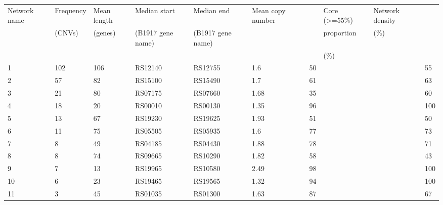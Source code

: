 


\begin{table}[]
\begin{tabular}{llllllllll}
Network name & Frequency & Mean length & Median start      & Median end        & Mean copy number &    & Core (\textgreater{}=55\%) & Network density &     \\
             & (CNVs)    & (genes)     & (B1917 gene name) & (B1917 gene name) &                  &    & proportion                 & (\%)            &     \\
             &           &             &                   &                   &                  &    & (\%)                       &                 &     \\
1            & 102       & 106         & RS12140           & RS12755           & 1.6              & 50 &                            &                 & 55  \\
2            & 57        & 82          & RS15100           & RS15490           & 1.7              & 61 &                            &                 & 63  \\
3            & 21        & 80          & RS07175           & RS07660           & 1.68             & 35 &                            &                 & 60  \\
4            & 18        & 20          & RS00010           & RS00130           & 1.35             & 96 &                            &                 & 100 \\
5            & 13        & 67          & RS19230           & RS19625           & 1.93             & 51 &                            &                 & 50  \\
6            & 11        & 75          & RS05505           & RS05935           & 1.6              & 77 &                            &                 & 73  \\
7            & 8         & 49          & RS04185           & RS04430           & 1.88             & 78 &                            &                 & 71  \\
8            & 8         & 74          & RS09665           & RS10290           & 1.82             & 58 &                            &                 & 43  \\
9            & 7         & 13          & RS19965           & RS10580           & 2.49             & 98 &                            &                 & 100 \\
10           & 6         & 23          & RS19465           & RS19565           & 1.32             & 94 &                            &                 & 100 \\
11           & 3         & 45          & RS01035           & RS01300           & 1.63             & 87 &                            &                 & 67 
\end{tabular}
\end{table}
